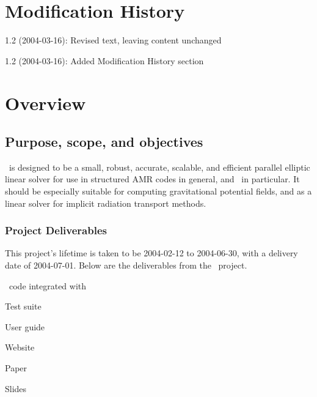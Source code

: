 \documentclass[11pt]{article}
\begin{document}

\section{Modification History}

\BeginDESCRIPTION
\item[1.2 (2004-03-16):] Revised text, leaving content unchanged
\item[1.2 (2004-03-16):] Added Modification History section
\EndDESCRIPTION


\section{Overview}

\subsection{Purpose, scope, and objectives}

\amrSolve\ is designed to be a small, robust, accurate, scalable, and efficient
parallel elliptic linear solver for use in structured AMR codes in
general, and \enzo\ in particular.  It should be especially suitable
for computing gravitational potential fields, and as a linear solver
for implicit radiation transport methods.

\subsubsection{Project Deliverables}

This project's lifetime is taken to be 2004-02-12 to 2004-06-30, with
a delivery date of 2004-07-01.  Below are the deliverables from the
\amrSolve\ project.
%
\BeginDESCRIPTION
  \item [\Label{D1:} ] \amrSolve\ code integrated with \enzo
  \item [\Label{D2:} ] Test suite
  \item [\Label{D3:} ] User guide 
  \item [\Label{D4:} ] Website 
  \item [\Label{D5:} ] Paper 
  \item [\Label{D6:} ] Slides
\EndDESCRIPTION
   
\end{document}
